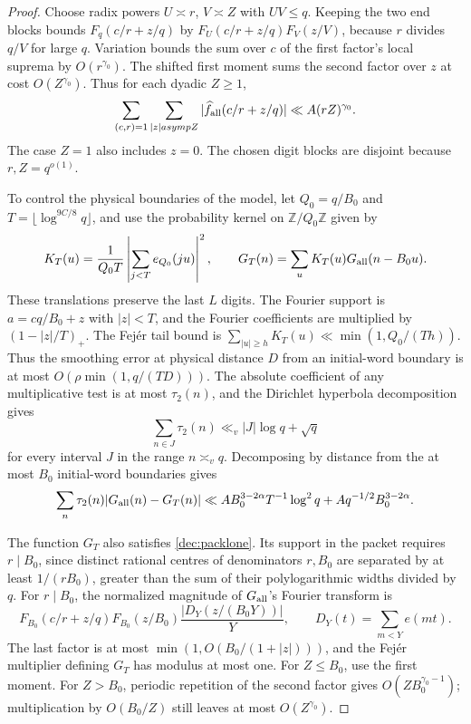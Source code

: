 \documentclass[11pt,a4paper]{article}
\theoremstyle{paperplain}
\numberwithin{equation}{section}
\begin{document}
\begin{proof}
Choose radix powers $U\asymp r$, $V\asymp Z$ with $UV\le q$.
Keeping the two end blocks bounds $F_q(c/r+z/q)$ by
$F_U(c/r+z/q)F_V(z/V)$, because $r$ divides $q/V$ for large $q$.
Variation bounds the sum over $c$ of the first factor's local suprema
by $O(r^{\gamma_0})$. The shifted first moment sums the second factor
over $z$ at cost $O(Z^{\gamma_0})$. Thus for each dyadic $Z\ge1$,
\begin{equation}\label{dec:packlone}
 \sum_{(c,r)=1}\sum_{|z|\asymp Z}
 |\widehat f_{\rm all}(c/r+z/q)|\ll A(rZ)^{\gamma_0}.
\end{equation}
The case $Z=1$ also includes $z=0$.
The chosen digit blocks are disjoint because $r,Z=q^{o(1)}$.

To control the physical boundaries of the model, let $Q_0=q/B_0$
and $T=\lfloor\log^{9C/8}q\rfloor$, and use the probability kernel
on $\mathbb Z/Q_0\mathbb Z$ given by
\[
 K_T(u)=\frac1{Q_0T}\left|\sum_{j<T}e_{Q_0}(ju)\right|^2,\qquad
 G_T(n)=\sum_uK_T(u)G_{\rm all}(n-B_0u).
\]
These translations preserve the last $L$ digits.
The Fourier support is $a=cq/B_0+z$ with $|z|<T$, and the
Fourier coefficients are multiplied by $(1-|z|/T)_+$.
The Fej\'er tail bound is
$\sum_{|u|\ge h}K_T(u)\ll\min(1,Q_0/(Th))$.
Thus the smoothing error at physical distance $D$ from an initial-word
boundary is at most $O(\rho\min(1,q/(TD)))$.
The absolute coefficient of any multiplicative test is at most
$\tau_2(n)$, and the Dirichlet hyperbola decomposition gives
\[
 \sum_{n\in J}\tau_2(n)\ll_v |J|\log q+\sqrt q
\]
for every interval $J$ in the range $n\asymp_vq$.
Decomposing by distance from the at most $B_0$ initial-word boundaries
gives
\begin{equation}\label{dec:smoothing}
 \sum_n\tau_2(n)|G_{\rm all}(n)-G_T(n)|
 \ll A B_0^{3-2\alpha}T^{-1}\log^2q
      +Aq^{-1/2}B_0^{3-2\alpha}.
\end{equation}

The function $G_T$ also satisfies \eqref{dec:packlone}. Its support
in the packet requires $r\mid B_0$, since distinct rational centres
of denominators $r,B_0$ are separated by at least $1/(rB_0)$, greater
than the sum of their polylogarithmic widths divided by $q$. For
$r\mid B_0$, the normalized magnitude of $G_{\rm all}$'s
Fourier transform is
\[
 F_{B_0}(c/r+z/q)F_{B_0}(z/B_0)
       \frac{|D_Y(z/(B_0Y))|}{Y},\qquad
 D_Y(t)=\sum_{m<Y}e(mt).
\]
The last factor is at most $\min(1,O(B_0/(1+|z|)))$, and the Fej\'er multiplier defining $G_T$ has modulus at most one.
For $Z\le B_0$, use the first moment.
For $Z>B_0$, periodic repetition of the second factor gives
$O(ZB_0^{\gamma_0-1})$; multiplication by $O(B_0/Z)$ still
leaves at most $O(Z^{\gamma_0})$.


\end{proof}
\end{document}
